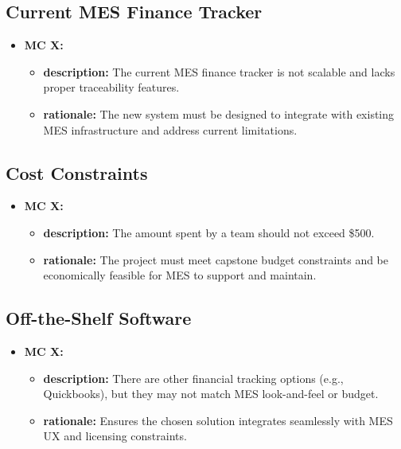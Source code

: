 \documentclass[12pt]{article}
\begin{document}
\subsection{Current MES Finance Tracker}
  \begin{itemize}
    \item \textbf{MC X:}
      \begin{itemize}[label=$\circ$]
        \item \textbf{description:} The current MES finance tracker is not scalable and lacks proper traceability features.
        \item \textbf{rationale:} The new system must be designed to integrate with existing MES infrastructure and address current limitations.
      \end{itemize}
  \end{itemize}

\subsection{Cost Constraints}
  \begin{itemize}
    \item \textbf{MC X:}
      \begin{itemize}[label=$\circ$]
        \item \textbf{description:} The amount spent by a team should not exceed \$500.
        \item \textbf{rationale:} The project must meet capstone budget constraints and be economically feasible for MES to support and maintain.
      \end{itemize}
  \end{itemize}

\subsection{Off-the-Shelf Software}
  \begin{itemize}
    \item \textbf{MC X:}
      \begin{itemize}[label=$\circ$]
        \item \textbf{description:} There are other financial tracking options (e.g., Quickbooks), but they may not match MES look-and-feel or budget.
        \item \textbf{rationale:} Ensures the chosen solution integrates seamlessly with MES UX and licensing constraints.
      \end{itemize}
  \end{itemize}
\end{document}
